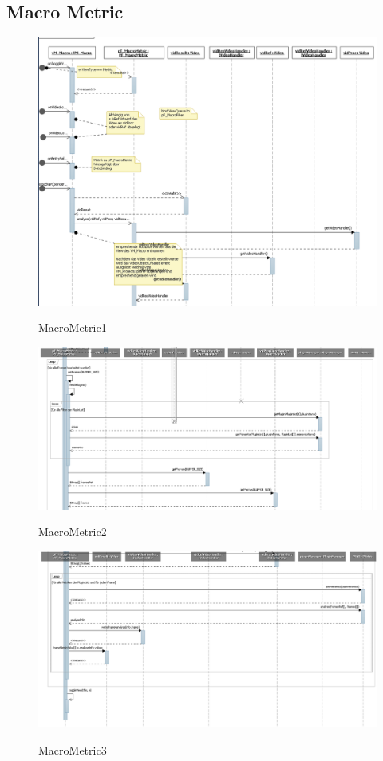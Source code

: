 \subsection{Macro Metric}
\begin{figure}[h]
\includegraphics[width=\linewidth]{bilder/Sequenzdiagramm/MacroMetric1.png}
\label{}
\caption{MacroMetric1}
\end{figure}

\begin{figure}[h]
\includegraphics[width=\linewidth]{bilder/Sequenzdiagramm/MacroMetric2.png}
\label{}
\caption{MacroMetric2}
\end{figure}

\begin{figure}[h]
\includegraphics[width=\linewidth]{bilder/Sequenzdiagramm/MacroMetric3.png}
\label{}
\caption{MacroMetric3}
\end{figure}


